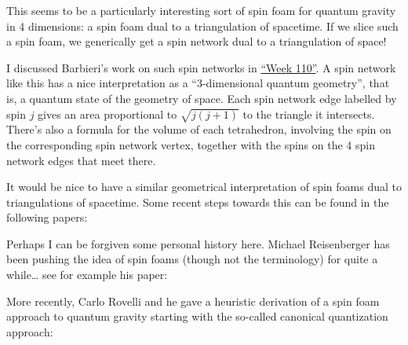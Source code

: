 \documentclass{article}
\def\tightlist{}
\renewcommand{\texttt}[1]{%
  \begingroup
  \ttfamily
  \begingroup\lccode`~=`/\lowercase{\endgroup\def~}{/\discretionary{}{}{}}%
  \begingroup\lccode`~=`[\lowercase{\endgroup\def~}{[\discretionary{}{}{}}%
  \begingroup\lccode`~=`.\lowercase{\endgroup\def~}{.\discretionary{}{}{}}%
  \catcode`/=\active\catcode`[=\active\catcode`.=\active
  \scantokens{#1\noexpand}%
  \endgroup
}
\begin{document}
This seems to be a particularly interesting sort of spin foam for
quantum gravity in 4 dimensions: a spin foam dual to a triangulation of
spacetime. If we slice such a spin foam, we generically get a spin
network dual to a triangulation of space!

I discussed Barbieri's work on such spin networks in
\protect\hyperlink{week110}{``Week 110''}. A spin network like this has
a nice interpretation as a ``3-dimensional quantum geometry'', that is,
a quantum state of the geometry of space. Each spin network edge
labelled by spin \(j\) gives an area proportional to \(\sqrt{j(j+1)}\)
to the triangle it intersects. There's also a formula for the volume of
each tetrahedron, involving the spin on the corresponding spin network
vertex, together with the spins on the 4 spin network edges that meet
there.

It would be nice to have a similar geometrical interpretation of spin
foams dual to triangulations of spacetime. Some recent steps towards
this can be found in the following papers:


Perhaps I can be forgiven some personal history here. Michael
Reisenberger has been pushing the idea of spin foams (though not the
terminology) for quite a while\ldots{} see for example his paper:


More recently, Carlo Rovelli and he gave a heuristic derivation of a
spin foam approach to quantum gravity starting with the so-called
canonical quantization approach:
\end{document}
